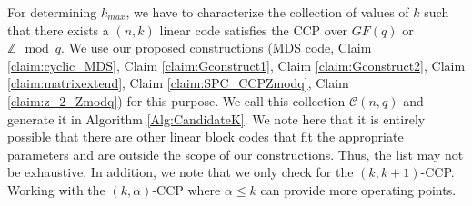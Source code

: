 \documentclass[journal,twocolumn]{IEEEtran}
\theoremstyle{definition}
\newcommand{\calC}{\mathcal{C}}
\newcommand{\aditya}[1]{\marginpar{+}{\bf Aditya's remark}: {\em #1}}
\newcommand{\litang}[1]{\marginpar{+}{\bf Li's remark}: {\em #1}}
\begin{document}
For determining $k_{max}$, we have to characterize the collection of values of $k$ such that there exists a $(n,k)$ linear code satisfies the CCP over $GF(q)$ or $\mathbb{Z} \mod q$. We use our proposed constructions (MDS code, Claim \ref{claim:cyclic_MDS}, Claim \ref{claim:Gconstruct1}, Claim \ref{claim:Gconstruct2}, Claim \ref{claim:matrixextend}, Claim \ref{claim:SPC_CCPZmodq}, Claim \ref{claim:z_2_Zmodq}) for this purpose. We call this collection $\calC(n,q)$ and generate it in Algorithm \ref{Alg:CandidateK}. We note here that it is entirely possible that there are other linear block codes that fit the appropriate parameters and are outside the scope of our constructions. Thus, the list may not be exhaustive. In addition, we note that we only check for the $(k,k+1)$-CCP. Working with the $(k,\alpha)$-CCP where $\alpha \leq k$ can provide more operating points. %


\end{document}
